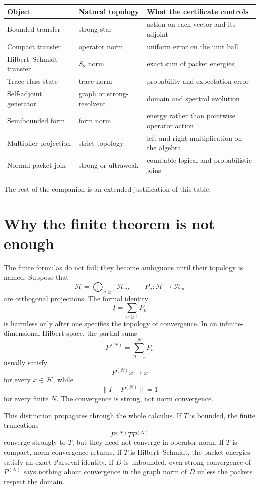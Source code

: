 \documentclass[11pt]{article}
\theoremstyle{definition}
\theoremstyle{remark}
\begin{document}
{\small\setlength{\tabcolsep}{4pt}\begin{longtable}{L{1.20in}L{1.35in}L{3.55in}}
\toprule
Object & Natural topology & What the certificate controls\\
\midrule
Bounded transfer & strong-star & action on each vector and its adjoint\\
Compact transfer & operator norm & uniform error on the unit ball\\
Hilbert--Schmidt transfer & $S_2$ norm & exact sum of packet energies\\
Trace-class state & trace norm & probability and expectation error\\
Self-adjoint generator & graph or strong-resolvent & domain and spectral evolution\\
Semibounded form & form norm & energy rather than pointwise operator action\\
Multiplier projection & strict topology & left and right multiplication on the algebra\\
Normal packet join & strong or ultraweak & countable logical and probabilistic joins\\
\bottomrule
\end{longtable}}

The rest of the companion is an extended justification of this table.

\section{Why the finite theorem is not enough}
The finite formulas do not fail; they become ambiguous until their topology is named.
Suppose that
\[
\mathcal H=\bigoplus_{n\ge1}\mathcal H_n,
\qquad
P_n:\mathcal H\to\mathcal H_n
\]
are orthogonal projections.  The formal identity
\[
I=\sum_{n\ge1}P_n
\]
is harmless only after one specifies the topology of convergence.  In an infinite-dimensional Hilbert space, the partial sums
\[
P^{(N)}=\sum_{n=1}^NP_n
\]
usually satisfy
\[
P^{(N)}x\longrightarrow x
\]
for every $x\in\mathcal H$, while
\[
\|I-P^{(N)}\|=1
\]
for every finite $N$.  The convergence is strong, not norm convergence.

This distinction propagates through the whole calculus.  If $T$ is bounded, the finite truncations
\[
P^{(N)}TP^{(N)}
\]
converge strongly to $T$, but they need not converge in operator norm.  If $T$ is compact, norm convergence returns.  If $T$ is Hilbert--Schmidt, the packet energies satisfy an exact Parseval identity.  If $D$ is unbounded, even strong convergence of $P^{(N)}$ says nothing about convergence in the graph norm of $D$ unless the packets respect the domain.
\end{document}
